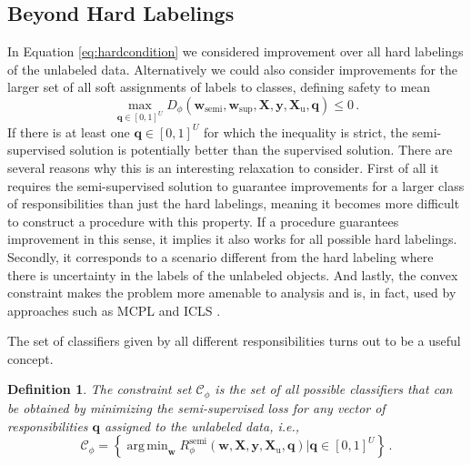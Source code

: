 \documentclass[twoside]{memoir}\usepackage[]{graphicx}\usepackage{xcolor}
\DeclareMathOperator*{\argmin}{arg\,min}
\newtheorem{definition}{Definition}
\begin{document}
\subsection{Beyond Hard Labelings}
In Equation \eqref{eq:hardcondition} we considered improvement over all hard labelings of the unlabeled data. Alternatively we could also consider improvements for the larger set of all soft assignments of labels to classes, defining safety to mean
\begin{equation} \label{eq:softcondition}
\max_{\mathbf{q} \in [0,1]^U} {D}_\phi(\mathbf{w}_\mathrm{semi},\mathbf{w}_\mathrm{sup},\mathbf{X},\mathbf{y},\mathbf{X}_\mathrm{u},\mathbf{q}) \leq 0 \,.
\end{equation}
If there is at least one $\mathbf{q} \in [0,1]^U$ for which the inequality is strict, the semi-supervised solution is potentially better than the supervised solution. There are several reasons why this is an interesting relaxation to consider. First of all it requires the semi-supervised solution to guarantee improvements for a larger class of responsibilities than just the hard labelings, meaning it becomes more difficult to construct a procedure with this property. If a procedure guarantees improvement in this sense, it implies it also works for all possible hard labelings. Secondly, it corresponds to a scenario different from the hard labeling where there is uncertainty in the labels of the unlabeled objects. And lastly, the convex constraint makes the problem more amenable to analysis and is, in fact, used by approaches such as MCPL \citep{Loog2016} and ICLS \citep{Krijthe2015}.

The set of classifiers given by all different responsibilities turns out to be a useful concept.
\begin{definition}\label{def:conset}
The constraint set $\mathcal{C}_\phi$ is the set of all possible classifiers that can be obtained by minimizing the semi-supervised loss for any vector of responsibilities $\mathbf{q}$ assigned to the unlabeled data, i.e.,
$$\mathcal{C}_\phi = \left\{ \argmin_\mathbf{w} {R}^\mathrm{semi}_\phi(\mathbf{w},\mathbf{X},\mathbf{y},\mathbf{X}_\mathrm{u},\mathbf{q}) \Big| \mathbf{q} \in [0,1]^U \right\} \, . $$
\end{definition}
\end{document}
